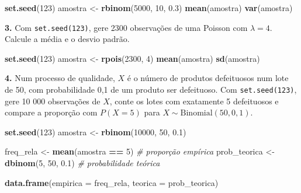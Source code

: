 \documentclass[
  portuguese,
  11pt,
  openany]{book}
\newenvironment{Shaded}{\begin{snugshade}}{\end{snugshade}}
\newcommand{\AttributeTok}[1]{\textcolor[rgb]{0.13,0.29,0.53}{#1}}
\newcommand{\CommentTok}[1]{\textcolor[rgb]{0.56,0.35,0.01}{\textit{#1}}}
\newcommand{\DecValTok}[1]{\textcolor[rgb]{0.00,0.00,0.81}{#1}}
\newcommand{\FloatTok}[1]{\textcolor[rgb]{0.00,0.00,0.81}{#1}}
\newcommand{\FunctionTok}[1]{\textcolor[rgb]{0.13,0.29,0.53}{\textbf{#1}}}
\newcommand{\NormalTok}[1]{#1}
\newcommand{\OtherTok}[1]{\textcolor[rgb]{0.56,0.35,0.01}{#1}}
\newcommand{\SpecialCharTok}[1]{\textcolor[rgb]{0.81,0.36,0.00}{\textbf{#1}}}
\begin{document}
\begin{Shaded}
\begin{Highlighting}[]
\FunctionTok{set.seed}\NormalTok{(}\DecValTok{123}\NormalTok{)}
\NormalTok{amostra }\OtherTok{\textless{}{-}} \FunctionTok{rbinom}\NormalTok{(}\DecValTok{5000}\NormalTok{, }\DecValTok{10}\NormalTok{, }\FloatTok{0.3}\NormalTok{)}
\FunctionTok{mean}\NormalTok{(amostra)}
\FunctionTok{var}\NormalTok{(amostra)}
\end{Highlighting}
\end{Shaded}

\textbf{3.} Com \texttt{set.seed(123)}, gere 2300 observações de uma Poisson com \(\lambda = 4\).
Calcule a média e o desvio padrão.

\begin{Shaded}
\begin{Highlighting}[]
\FunctionTok{set.seed}\NormalTok{(}\DecValTok{123}\NormalTok{)}
\NormalTok{amostra }\OtherTok{\textless{}{-}} \FunctionTok{rpois}\NormalTok{(}\DecValTok{2300}\NormalTok{, }\DecValTok{4}\NormalTok{)}
\FunctionTok{mean}\NormalTok{(amostra)}
\FunctionTok{sd}\NormalTok{(amostra)}
\end{Highlighting}
\end{Shaded}

\textbf{4.} Num processo de qualidade, \(X\) é o número de produtos defeituosos num lote de 50,
com probabilidade 0,1 de um produto ser defeituoso. Com \texttt{set.seed(123)}, gere 10 000
observações de \(X\), conte os lotes com exatamente 5 defeituosos e compare a proporção
com \(P(X = 5)\) para \(X \sim \text{Binomial}(50, 0{,}1)\).

\begin{Shaded}
\begin{Highlighting}[]
\FunctionTok{set.seed}\NormalTok{(}\DecValTok{123}\NormalTok{)}
\NormalTok{amostra }\OtherTok{\textless{}{-}} \FunctionTok{rbinom}\NormalTok{(}\DecValTok{10000}\NormalTok{, }\DecValTok{50}\NormalTok{, }\FloatTok{0.1}\NormalTok{)}

\NormalTok{freq\_rela }\OtherTok{\textless{}{-}} \FunctionTok{mean}\NormalTok{(amostra }\SpecialCharTok{==} \DecValTok{5}\NormalTok{)          }\CommentTok{\# proporção empírica}
\NormalTok{prob\_teorica }\OtherTok{\textless{}{-}} \FunctionTok{dbinom}\NormalTok{(}\DecValTok{5}\NormalTok{, }\DecValTok{50}\NormalTok{, }\FloatTok{0.1}\NormalTok{)       }\CommentTok{\# probabilidade teórica}

\FunctionTok{data.frame}\NormalTok{(}\AttributeTok{empirica =}\NormalTok{ freq\_rela, }\AttributeTok{teorica =}\NormalTok{ prob\_teorica)}
\end{Highlighting}
\end{Shaded}
\end{document}
